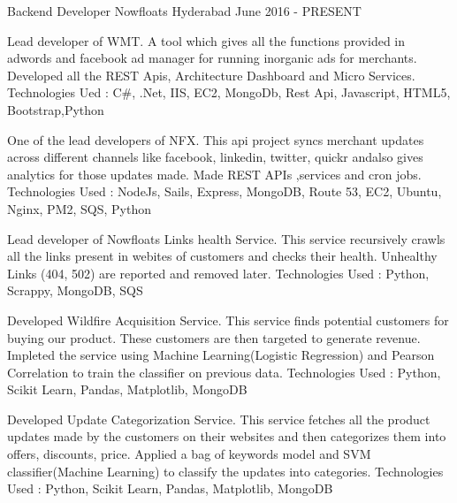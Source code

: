 

\begin{cventries}

  \cventry
    {Backend Developer} %
    {Nowfloats} %
    {Hyderabad} %
    {June 2016 - PRESENT} %
    {
      \begin{cvitems} %
        \item {Lead developer of WMT. A tool which gives all the functions provided in adwords and facebook ad manager for running inorganic ads for merchants. Developed all the REST Apis, Architecture Dashboard and Micro Services. Technologies Ued : C\#, .Net, IIS, EC2, MongoDb, Rest Api, Javascript, HTML5, Bootstrap,Python}
        \item {One of the lead developers of NFX. This api project syncs merchant updates across different channels like facebook, linkedin, twitter, quickr andalso gives analytics for those updates made. Made REST APIs ,services and cron jobs. Technologies Used : NodeJs, Sails, Express, MongoDB, Route 53, EC2, Ubuntu, Nginx, PM2, SQS, Python}
        \item {Lead developer of Nowfloats Links health Service. This service recursively crawls all the links present in webites of customers and checks their health. Unhealthy Links (404, 502) are reported and removed later. Technologies Used : Python, Scrappy, MongoDB, SQS  }
        \item {Developed Wildfire Acquisition Service. This service finds potential customers for buying our product. These customers are then targeted to generate revenue. Impleted the service using Machine Learning(Logistic Regression) and Pearson Correlation to train the classifier on previous data. Technologies Used : Python, Scikit Learn, Pandas, Matplotlib, MongoDB  }
        \item {Developed Update Categorization Service. This service fetches all the product updates made by the customers on their websites and then categorizes them into offers, discounts, price. Applied a bag of keywords model and SVM classifier(Machine Learning) to classify the updates into categories. Technologies Used : Python, Scikit Learn, Pandas, Matplotlib, MongoDB  }
      \end{cvitems}
    }


\end{cventries}
